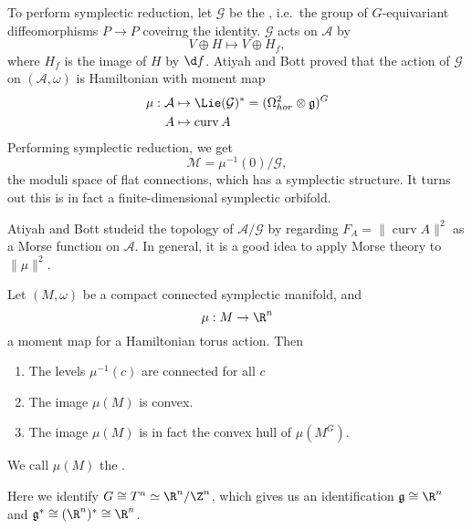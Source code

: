 \documentclass[a4paper]{article}
\DeclareMathOperator{\curv}{curv}
\begin{document}
\begin{eg}
  To perform symplectic reduction, let $\mathcal{G}$ be the , i.e.\ the group of $G$-equivariant diffeomorphisms $P \to P$ coveirng the identity. $\mathcal{G}$ acts on $\mathcal{A}$ by
  \[
    V \oplus H \mapsto V \oplus H_f,
  \]
  where $H_f$ is the image of $H$ by $\d f$. Atiyah and Bott proved that the action of $\mathcal{G}$ on $(\mathcal{A}, \omega)$ is Hamiltonian with moment map
  \begin{align*}
    \mu: \mathcal{A} &\mapsto \Lie(\mathcal{G})^* = (\Omega_{hor}^2 \otimes \mathfrak{g})^G\\
    A &\mapsto \curv A
  \end{align*}
  Performing symplectic reduction, we get
  \[
    \mathcal{M} = \mu^{-1}(0)/\mathcal{G},
  \]
  the moduli space of flat connections, which has a symplectic structure. It turns out this is in fact a finite-dimensional symplectic orbifold.
\end{eg}

Atiyah and Bott studeid the topology of $\mathcal{A}/\mathcal{G}$ by regarding $F_A = \|\curv A\|^2$ as a Morse function on $\mathcal{A}$. In general, it is a good idea to apply Morse theory to $\|\mu\|^2$.

\begin{thm}
  Let $(M, \omega)$ be a compact connected symplectic manifold, and
  \[
    \mu: M \to \R^n
  \]
  a moment map for a Hamiltonian torus action. Then
  \begin{enumerate}
    \item The levels $\mu^{-1}(c)$ are connected for all $c$
    \item The image $\mu(M)$ is convex.
    \item The image $\mu(M)$ is in fact the convex hull of $\mu(M^G)$.
  \end{enumerate}
  We call $\mu(M)$ the .
\end{thm}
Here we identify $G \cong T^n \simeq \R^n/\Z^n$, which gives us an identification $\mathfrak{g} \cong \R^n$ and $\mathfrak{g}^* \cong (\R^n)^* \cong\R^n$.
\end{document}
